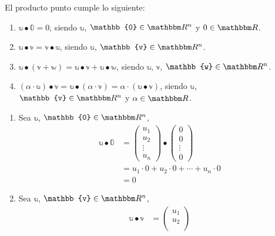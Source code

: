 \begin{proposition}
    El producto punto cumple lo siguiente:
    \begin{enumerate}[label=\roman*)]
        \item $\mathbb{u} \bullet \mathbb{0} = 0$, siendo $\mathbb{u}$, $\mathbb{0} \in \RR[n]$ y $0 \in \RR$.
        \item $\mathbb{u} \bullet \mathbb{v} = \mathbb{v} \bullet \mathbb{u}$, siendo $\mathbb{u}$, $\mathbb{v} \in \RR[n]$.
        \item $\mathbb{u} \bullet (\mathbb{v} + \mathbb{w}) = \mathbb{u} \bullet \mathbb{v} + \mathbb{u} \bullet \mathbb{w}$, siendo $\mathbb{u}$, $\mathbb{v}$, $\mathbb{w} \in \RR[n]$.
        \item $(\alpha \cdot \mathbb{u}) \bullet \mathbb{v} = \mathbb{u} \bullet (\alpha \cdot \mathbb{v}) = \alpha \cdot (\mathbb{u} \bullet \mathbb{v})$, siendo $\mathbb{u}$, $\mathbb{v} \in \RR[n]$ y $\alpha \in \RR$.
    \end{enumerate}
    \demostracion
    \begin{enumerate}[label=\roman*)]
        \item Sea $\mathbb{u}$, $\mathbb{0} \in \RR[n]$,
        \begin{align*}
            \mathbb{u} \bullet \mathbb{0} & = \begin{pmatrix}
                u_1 \\
                u_2 \\
                \vdots \\
                u_n
            \end{pmatrix} \bullet \begin{pmatrix}
                0 \\
                0 \\
                \vdots \\
                0
            \end{pmatrix} \\
            & = u_1 \cdot 0 + u_2 \cdot 0 + \cdots + u_n \cdot 0 \\
            & = 0
        \end{align*}
        \item Sea $\mathbb{u}$, $\mathbb{v} \in \RR[n]$,
        \begin{align*}
            \mathbb{u} \bullet \mathbb{v} & = \begin{pmatrix}
                u_1 \\
                u_2 \\

\end{pmatrix}
\end{align*}
\end{enumerate}
\end{proposition}
